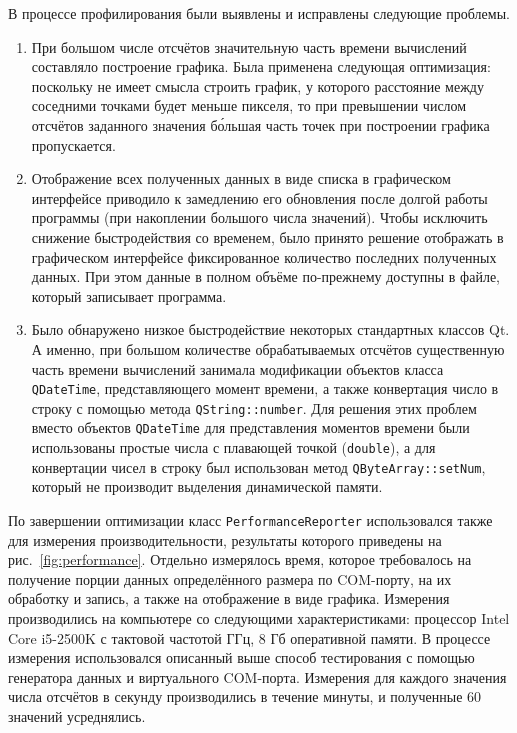 \documentclass[a4paper, 14pt, titlepage]{extarticle}
\newcommand{\inlinecode}[1]{\lstinline[basicstyle=\ttfamily]{#1}}
\newcommand{\eng}[1]{\foreignlanguage{english}{#1}}
\begin{document}
  В процессе профилирования были выявлены и исправлены следующие проблемы.
  \begin{enumerate}
    \item При большом числе отсчётов значительную часть времени вычислений составляло построение
      графика. Была применена следующая оптимизация: поскольку не имеет смысла строить график, у которого расстояние между соседними
      точками будет меньше пикселя, то при превышении числом отсчётов заданного значения
      б\'{о}льшая часть точек при построении графика пропускается.
    \item Отображение всех полученных данных в виде списка в графическом интерфейсе приводило к
      замедлению его обновления после долгой работы программы (при накоплении большого числа
      значений). Чтобы исключить снижение быстродействия со временем, было принято решение
      отображать в графическом интерфейсе фиксированное количество последних полученных данных. При
      этом данные в полном объёме по-прежнему доступны в файле, который записывает программа.
    \item Было обнаружено низкое быстродействие некоторых стандартных классов Qt. А именно, при
      большом количестве обрабатываемых отсчётов существенную часть времени вычислений занимала
      модификации объектов класса \inlinecode{QDateTime}, представляющего момент времени, а также
      конвертация число в строку с помощью метода \inlinecode{QString::number}. Для решения этих
      проблем вместо объектов \inlinecode{QDateTime} для представления моментов времени были
      использованы простые числа с плавающей точкой (\inlinecode{double}), а для конвертации чисел в
      строку был использован метод \inlinecode{QByteArray::setNum}, который не производит выделения
      динамической памяти.
  \end{enumerate}

  По завершении оптимизации класс \inlinecode{PerformanceReporter} использовался также для измерения
  производительности, результаты которого приведены на рис.~\ref{fig:performance}. Отдельно
  измерялось время, которое требовалось на получение порции данных определённого размера по
  COM-порту, на их обработку и запись, а также на отображение в виде графика. Измерения
  производились на компьютере со следующими характеристиками: процессор \eng{Intel Core i5-2500K} с
  тактовой частотой  ГГц, 8 Гб оперативной памяти. В процессе измерения использовался
  описанный выше способ тестирования с помощью генератора данных и виртуального COM-порта.
  Измерения для каждого значения числа отсчётов в секунду производились в течение минуты, и
  полученные 60 значений усреднялись.
\end{document}
